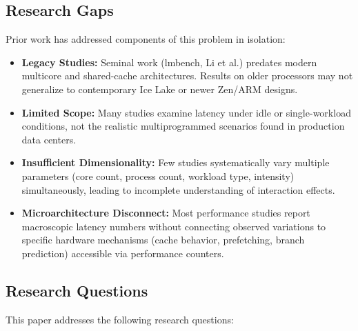 \documentclass[conference]{IEEEtran}
\begin{document}
\subsection{Research Gaps}

Prior work has addressed components of this problem in isolation:

\begin{itemize}
  \item \textbf{Legacy Studies:} Seminal work (lmbench, Li et al.) predates
        modern multicore and shared-cache architectures. Results on older
        processors may not generalize to contemporary Ice Lake or newer
        Zen/ARM designs.
  
  \item \textbf{Limited Scope:} Many studies examine latency under idle or
        single-workload conditions, not the realistic multiprogrammed scenarios
        found in production data centers.
  
  \item \textbf{Insufficient Dimensionality:} Few studies systematically vary
        multiple parameters (core count, process count, workload type, intensity)
        simultaneously, leading to incomplete understanding of interaction effects.
  
  \item \textbf{Microarchitecture Disconnect:} Most performance studies report
        macroscopic latency numbers without connecting observed variations to
        specific hardware mechanisms (cache behavior, prefetching, branch
        prediction) accessible via performance counters.
\end{itemize}

\subsection{Research Questions}

This paper addresses the following research questions:
\end{document}
